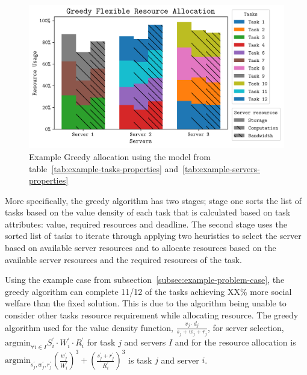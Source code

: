 \begin{figure}
    \centering
    \includegraphics[width=\linewidth]{figs/allocation/greedy_flexible_resource_allocation.png}
    \caption{Example Greedy allocation using the model from table~\ref{tab:example-tasks-properties}
    and~\ref{tab:example-servers-properties}}
    \label{fig:example-greedy-allocation}
\end{figure}

More specifically, the greedy algorithm has two stages; stage one sorts the list of tasks based on the value
density of each task that is calculated based on task attributes: value, required resources and deadline. The second
stage uses the sorted list of tasks to iterate through applying two heuristics to select the server based on
available server resources and to allocate resources based on the available server resources and the required resources
of the task.

Using the example case from subsection~\ref{subsec:example-problem-case}, the greedy algorithm can complete 11/12 of
the tasks achieving XX\% more social welfare than the fixed solution. This is due to the algorithm being unable to %
consider other tasks resource requirement while allocating resource. The greedy algorithm used for the value density
function, $\frac{v_j \cdot d_j}{s_j + w_j + r_j}$, for server selection, $\text{argmin}_{\forall i \in I} S^{'}_i \cdot W^{'}_i \cdot R^{'}_i$
for task $j$ and servers $I$ and for the resource allocation is
$\text{argmin}_{s^{'}_j, w^{'}_j, r^{'}_j} \left(\frac{w^{'}_j}{W^{'}_i}\right)^3 + \left(\frac{s^{'}_j + r^{'}_j}{R^{'}_i}\right)^3$
is task $j$ and server $i$.

